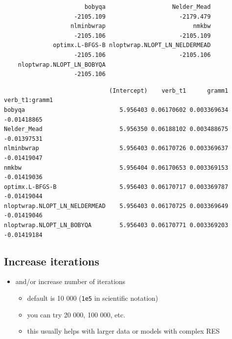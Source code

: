 \documentclass[
  letterpaper,
  DIV=11,
  numbers=noendperiod]{scrartcl}
\newenvironment{Shaded}{\begin{snugshade}}{\end{snugshade}}
\newcommand{\FunctionTok}[1]{\textcolor[rgb]{0.28,0.35,0.67}{#1}}
\newcommand{\NormalTok}[1]{\textcolor[rgb]{0.00,0.23,0.31}{#1}}
\newcommand{\SpecialCharTok}[1]{\textcolor[rgb]{0.37,0.37,0.37}{#1}}
\providecommand{\tightlist}{%
  \setlength{\itemsep}{0pt}\setlength{\parskip}{0pt}}\usepackage{longtable,booktabs,array}
\begin{document}
\begin{verbatim}
                       bobyqa                   Nelder_Mead 
                    -2105.109                     -2179.479 
                   nlminbwrap                         nmkbw 
                    -2105.106                     -2105.109 
              optimx.L-BFGS-B nloptwrap.NLOPT_LN_NELDERMEAD 
                    -2105.106                     -2105.106 
    nloptwrap.NLOPT_LN_BOBYQA 
                    -2105.106 
\end{verbatim}

\begin{Shaded}
\end{Shaded}

\begin{verbatim}
                              (Intercept)    verb_t1      gramm1 verb_t1:gramm1
bobyqa                           5.956403 0.06170602 0.003369634    -0.01418865
Nelder_Mead                      5.956350 0.06188102 0.003488675    -0.01397531
nlminbwrap                       5.956403 0.06170726 0.003369637    -0.01419047
nmkbw                            5.956404 0.06170653 0.003369153    -0.01419036
optimx.L-BFGS-B                  5.956403 0.06170717 0.003369787    -0.01419044
nloptwrap.NLOPT_LN_NELDERMEAD    5.956403 0.06170725 0.003369649    -0.01419046
nloptwrap.NLOPT_LN_BOBYQA        5.956403 0.06170771 0.003369203    -0.01419184
\end{verbatim}

\hypertarget{increase-iterations}{%
\subsection{Increase iterations}\label{increase-iterations}}

\begin{itemize}
\tightlist
\item
  and/or increase number of iterations

  \begin{itemize}
  \tightlist
  \item
    default is 10 000 (\texttt{1e5} in scientific notation)
  \item
    you can try 20 000, 100 000, etc.
  \item
    this usually helps with larger data or models with complex RES
  \end{itemize}
\end{itemize}
\end{document}
